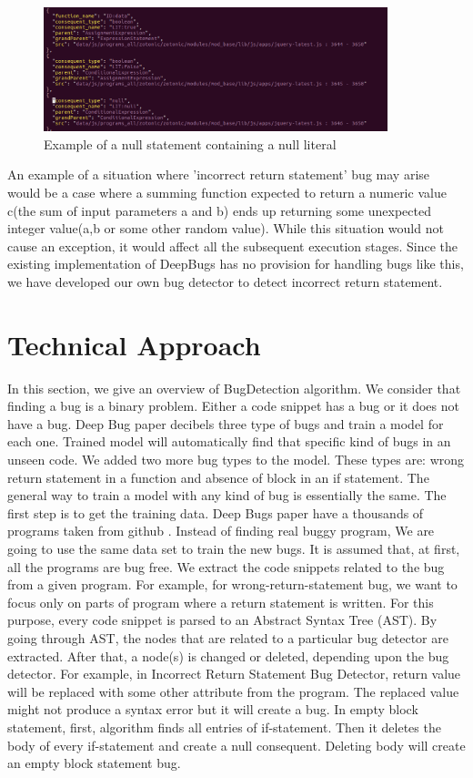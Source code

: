 \documentclass[sigconf]{acmart}
\begin{document}
\begin{figure}[h!]
\includegraphics[width=100mm]{untitled(4).png}
\caption{Example of a null statement containing a null literal}
\end{figure}
\newline An example of a situation where 'incorrect return statement' bug may arise would be a case where a summing function expected to return a numeric value c(the sum of input parameters a and b) ends up returning some unexpected integer value(a,b or some other random value). While this situation would not cause an exception, it would affect all the subsequent execution stages. Since the existing implementation of DeepBugs has no provision for handling bugs like this, we  have developed our own bug detector to detect incorrect return statement.


\section{Technical Approach}
    In this section, we give an overview of BugDetection algorithm. We consider that finding a bug is a binary problem. Either a code snippet has a bug or it does not have a bug. Deep Bug paper decibels three type of bugs and train a model for each one. Trained model will automatically find that specific kind of bugs in an unseen code. We added two more bug types to the model. These types are: wrong return statement in a function and absence of block in an if statement. 
    The general way to train a model with any kind of bug is essentially the same. The first step is to get the training data. Deep Bugs paper have a thousands of programs taken from github \cite{pradel2018deepbugs}. Instead of finding real buggy program, We are going to use the same data set to train the new bugs. It is assumed that, at first, all the programs are bug free. We extract the code snippets related to the bug from a given program. For example, for wrong-return-statement bug, we want to focus only on parts of program where a return statement is written. For this purpose, every code snippet is parsed to an Abstract Syntax Tree (AST). By going through AST, the nodes that are related to a particular bug detector are extracted. After that, a node(s) is changed or deleted, depending upon the bug detector. For example, in Incorrect Return Statement Bug Detector, return value will be replaced with some other attribute from the program. The replaced value might not produce a syntax error but it will create a bug. In empty block statement, first, algorithm finds all entries of if-statement. Then it deletes the body of every if-statement and create a null consequent. Deleting body will create an empty block statement bug. 
    
\end{document}
